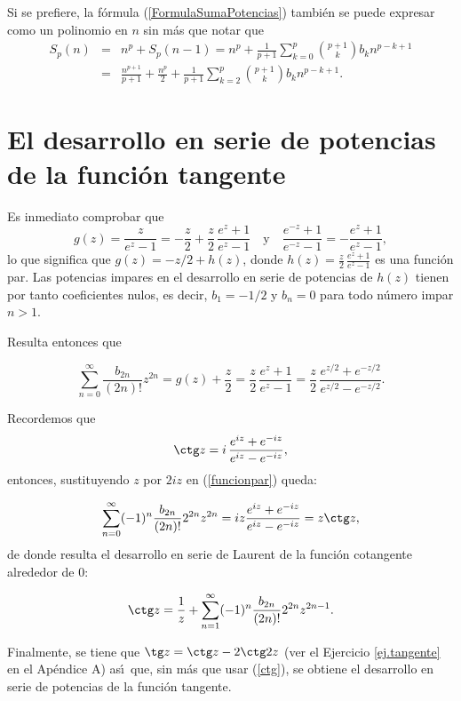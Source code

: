 \begin{observacion*} Si se prefiere, la f\'ormula (\ref{FormulaSumaPotencias}) tambi\'en se puede expresar como un polinomio en $n$ sin m\'as que notar que
\begin{eqnarray*}S_p(n)&=&n^p+S_p(n-1)=n^p+\frac{1}{p+1}\sum_{k=0}^p{p+1\choose k}b_kn^{p-k+1}\\ &=&
\frac{n^{p+1}}{p+1}+\frac{n^p}{2}+\frac{1}{p+1}\sum_{k=2}^p{p+1\choose k}b_kn^{p-k+1}.\end{eqnarray*}
\end{observacion*}

\section{El desarrollo en serie de potencias de la funci\'on tangente}

Es inmediato comprobar que
$$
g(z)=\frac{z}{e^z-1}=-\frac{z}{2}+\frac{z}{2}\,\frac{e^z+1}{e^z-1} \quad\text{y}\quad
\frac{e^{-z}+1}{e^{-z}-1}=-\frac{e^z+1}{e^z-1},$$
lo que significa que $g(z)=-z/2+h(z)$, donde $\displaystyle h(z)=\frac{z}{2}\,\frac{e^z+1}{e^z-1}$ es una funci\'on par. Las potencias impares en el desarrollo en serie de potencias de $h(z)$ tienen por  tanto coeficientes nulos, es decir, $b_1=-1/2$ y $b_n=0$ para todo n\'umero impar $n>1$.

Resulta entonces que

\begin{equation}\label{funcionpar}\sum_{n=0}^\infty\frac{b_{2n}}{(2n)!}z^{2n}=g(z)+\frac{z}{2}=
\frac{z}{2}\,\frac{e^z+1}{e^z-1}=\frac{z}{2}\,\frac{e^{z/2}+e^{-z/2}}{e^{z/2}-e^{-z/2}}.
\end{equation}

Recordemos que
$$\ctg z=i\,\frac{e^{iz}+e^{-iz}}{e^{iz}-e^{-iz}},$$
entonces, sustituyendo $z$ por $2iz$ en (\ref{funcionpar}) queda:

$$\sum_{n=0}^\infty (-1)^n\frac{b_{2n}}{(2n)!}2^{2n}z^{2n}=iz\frac{e^{iz}+e^{-iz}}{e^{iz}-e^{-iz}}=z\ctg z,$$
de donde resulta el desarrollo en serie de Laurent de la funci\'on cotangente alrededor de $0$:

\begin{equation}\label{ctg}\ctg z=\frac{1}{z}+\sum_{n=1}^\infty (-1)^n\frac{b_{2n}}{(2n)!}2^{2n}z^{2n-1}.
\end{equation}

Finalmente, se tiene que $\tg z=\ctg z-2\ctg 2z$ (ver el Ejercicio \ref{ej.tangente} en el Ap\'endice A)  as\'\i\ que, sin m\'as que usar (\ref{ctg}), se obtiene el desarrollo en serie de potencias de la funci\'on tangente.

